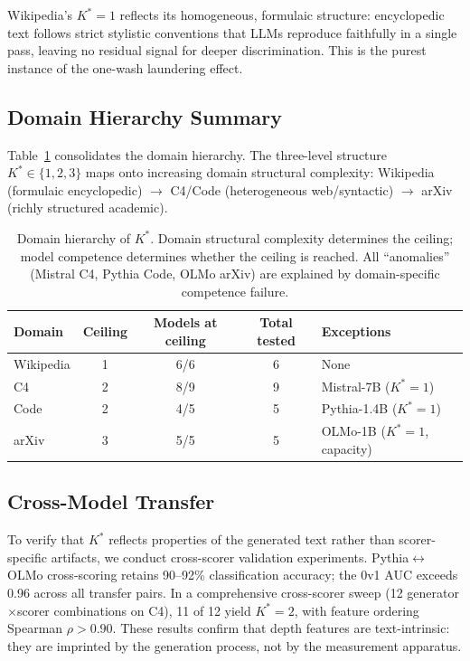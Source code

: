 \documentclass[11pt,a4paper]{article}
\newcommand{\kstar}{K^{*}}
\begin{document}
Wikipedia's $\kstar\!=\!1$ reflects its homogeneous, formulaic structure: encyclopedic text follows strict stylistic conventions that LLMs reproduce faithfully in a single pass, leaving no residual signal for deeper discrimination.
This is the purest instance of the one-wash laundering effect.

\subsection{Domain Hierarchy Summary}
\label{sec:hierarchy}

Table~\ref{tab:domain_hierarchy} consolidates the domain hierarchy.
The three-level structure $\kstar \in \{1, 2, 3\}$ maps onto increasing domain structural complexity: Wikipedia (formulaic encyclopedic) $\to$ C4/Code (heterogeneous web/syntactic) $\to$ arXiv (richly structured academic).

\begin{table}[t]
\centering
\caption{Domain hierarchy of $\kstar$. Domain structural complexity determines the ceiling; model competence determines whether the ceiling is reached. All ``anomalies'' (Mistral C4, Pythia Code, OLMo arXiv) are explained by domain-specific competence failure.}
\label{tab:domain_hierarchy}
\small
\begin{tabular}{lcccl}
\toprule
\textbf{Domain} & \textbf{Ceiling} & \textbf{Models at ceiling} & \textbf{Total tested} & \textbf{Exceptions} \\
\midrule
Wikipedia & 1 & 6/6 & 6 & None \\
C4        & 2 & 8/9 & 9 & Mistral-7B ($\kstar\!=\!1$) \\
Code      & 2 & 4/5 & 5 & Pythia-1.4B ($\kstar\!=\!1$) \\
arXiv     & 3 & 5/5 & 5 & OLMo-1B ($\kstar\!=\!1$, capacity) \\
\bottomrule
\end{tabular}
\end{table}

\subsection{Cross-Model Transfer}
\label{sec:transfer}

To verify that $\kstar$ reflects properties of the generated text rather than scorer-specific artifacts, we conduct cross-scorer validation experiments.
Pythia$\leftrightarrow$OLMo cross-scoring retains 90--92\% classification accuracy; the 0v1 AUC exceeds 0.96 across all transfer pairs.
In a comprehensive cross-scorer sweep (12 generator$\times$scorer combinations on C4), 11 of 12 yield $\kstar\!=\!2$, with feature ordering Spearman $\rho > 0.90$.
These results confirm that depth features are text-intrinsic: they are imprinted by the generation process, not by the measurement apparatus.
\end{document}
